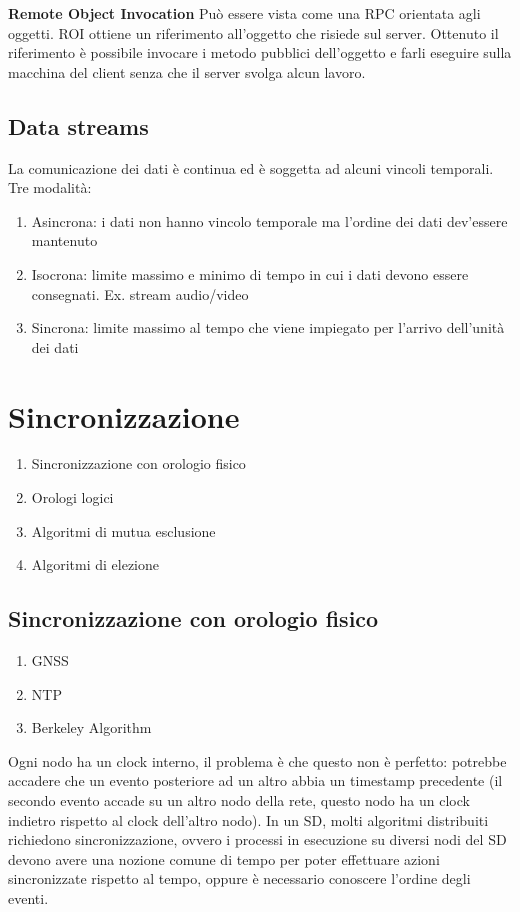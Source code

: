 \documentclass[12pt,italian]{report}
\begin{document}
\bigbreak
\noindent \textbf{Remote Object Invocation}
Può  essere vista come una RPC orientata agli oggetti. ROI ottiene un riferimento all'oggetto che risiede sul server. Ottenuto il riferimento è possibile invocare i metodo pubblici dell'oggetto e farli eseguire sulla macchina del client senza che il server svolga alcun lavoro.

\section{Data streams}
La comunicazione dei dati è continua ed è soggetta ad alcuni vincoli temporali. \\ Tre modalità: 
\begin{enumerate}
    \item Asincrona: i dati non hanno vincolo temporale ma l'ordine dei dati dev'essere mantenuto 
    \item Isocrona: limite massimo e minimo di tempo in cui i dati devono essere consegnati. Ex. stream audio/video
    \item Sincrona: limite massimo al tempo che viene impiegato per l'arrivo dell'unità dei dati 
\end{enumerate}

\chapter{Sincronizzazione}
\label{cap:sincro}
\begin{enumerate}
    \item Sincronizzazione con orologio fisico
    \item Orologi logici
    \item Algoritmi di mutua esclusione
    \item Algoritmi di elezione
\end{enumerate}

\section{Sincronizzazione con orologio fisico}
\begin{enumerate}
    \item GNSS
    \item NTP
    \item Berkeley Algorithm
\end{enumerate}
Ogni nodo ha un clock interno, il problema è che questo non è perfetto: potrebbe accadere che un evento posteriore ad un altro abbia un timestamp precedente (il secondo evento accade su un altro nodo della rete, questo nodo ha un clock indietro rispetto al clock dell'altro nodo). 
\bigbreak
In un SD, molti algoritmi distribuiti richiedono sincronizzazione, ovvero i processi in esecuzione su diversi nodi del SD devono avere una nozione comune di tempo per poter effettuare azioni sincronizzate rispetto al tempo, oppure è necessario conoscere l'ordine degli eventi. 
\end{document}
